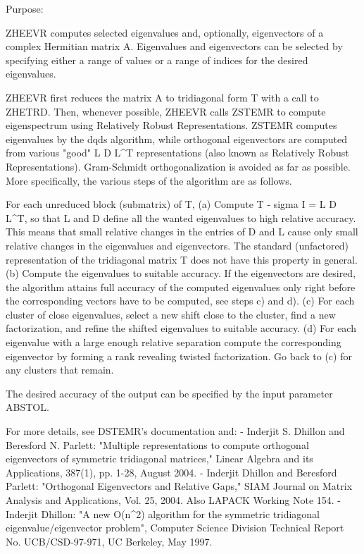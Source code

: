  \begin{DoxyParagraph}{Purpose\+: }
\begin{DoxyVerb} ZHEEVR computes selected eigenvalues and, optionally, eigenvectors
 of a complex Hermitian matrix A.  Eigenvalues and eigenvectors can
 be selected by specifying either a range of values or a range of
 indices for the desired eigenvalues.

 ZHEEVR first reduces the matrix A to tridiagonal form T with a call
 to ZHETRD.  Then, whenever possible, ZHEEVR calls ZSTEMR to compute
 eigenspectrum using Relatively Robust Representations.  ZSTEMR
 computes eigenvalues by the dqds algorithm, while orthogonal
 eigenvectors are computed from various "good" L D L^T representations
 (also known as Relatively Robust Representations). Gram-Schmidt
 orthogonalization is avoided as far as possible. More specifically,
 the various steps of the algorithm are as follows.

 For each unreduced block (submatrix) of T,
    (a) Compute T - sigma I  = L D L^T, so that L and D
        define all the wanted eigenvalues to high relative accuracy.
        This means that small relative changes in the entries of D and L
        cause only small relative changes in the eigenvalues and
        eigenvectors. The standard (unfactored) representation of the
        tridiagonal matrix T does not have this property in general.
    (b) Compute the eigenvalues to suitable accuracy.
        If the eigenvectors are desired, the algorithm attains full
        accuracy of the computed eigenvalues only right before
        the corresponding vectors have to be computed, see steps c) and d).
    (c) For each cluster of close eigenvalues, select a new
        shift close to the cluster, find a new factorization, and refine
        the shifted eigenvalues to suitable accuracy.
    (d) For each eigenvalue with a large enough relative separation compute
        the corresponding eigenvector by forming a rank revealing twisted
        factorization. Go back to (c) for any clusters that remain.

 The desired accuracy of the output can be specified by the input
 parameter ABSTOL.

 For more details, see DSTEMR's documentation and:
 - Inderjit S. Dhillon and Beresford N. Parlett: "Multiple representations
   to compute orthogonal eigenvectors of symmetric tridiagonal matrices,"
   Linear Algebra and its Applications, 387(1), pp. 1-28, August 2004.
 - Inderjit Dhillon and Beresford Parlett: "Orthogonal Eigenvectors and
   Relative Gaps," SIAM Journal on Matrix Analysis and Applications, Vol. 25,
   2004.  Also LAPACK Working Note 154.
 - Inderjit Dhillon: "A new O(n^2) algorithm for the symmetric
   tridiagonal eigenvalue/eigenvector problem",
   Computer Science Division Technical Report No. UCB/CSD-97-971,
   UC Berkeley, May 1997.



\end{DoxyVerb}
\end{DoxyParagraph}

